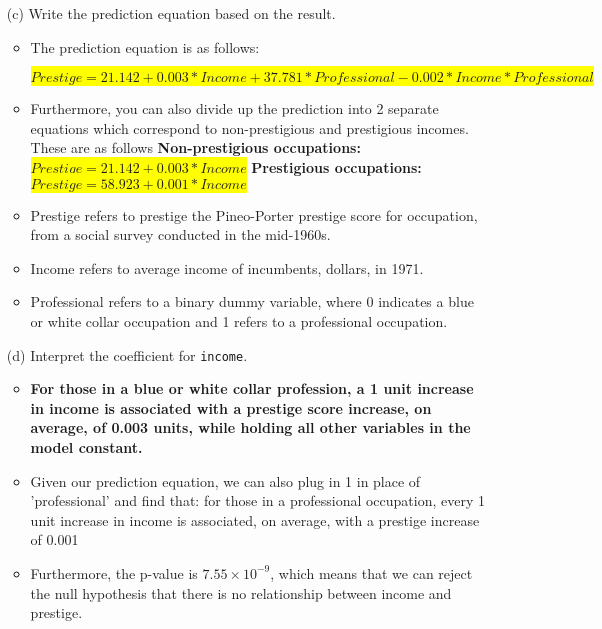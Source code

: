 \documentclass[12pt,letterpaper]{article}
\begin{document}
\begin{enumerate}
\begin{itemize}
\end{itemize}

	\item [(c)]
	Write the prediction equation based on the result.
	
	
\begin{itemize}
	\item The prediction equation is as follows:
	
	\hspace*{-1.5cm} 
	\colorbox{yellow}{$Prestige = 21.142 + 0.003*Income + 37.781*Professional - 0.002*Income*Professional$}
	\item Furthermore, you can also divide up the prediction into 2 separate equations which correspond to non-prestigious and prestigious incomes. These are as follows
	\newline \textbf{Non-prestigious occupations:} \colorbox{yellow}{$Prestige = 21.142 + 0.003*Income$}
	\newline \textbf{Prestigious occupations:}\colorbox{yellow}{$Prestige = 58.923 + 0.001*Income$}
	\item Prestige refers to prestige the Pineo-Porter prestige score for occupation, from a social survey conducted in the mid-1960s.
	\item Income refers to average income of incumbents, dollars, in 1971.
	\item Professional refers to a binary dummy variable, where 0 indicates a blue or white collar occupation and 1 refers to a professional occupation.
 
\end{itemize}
	
\newpage
	\item [(d)]
	Interpret the coefficient for \texttt{income}.
	
	
\begin{itemize}
	\item \textbf{For those in a blue or white collar profession, a 1 unit increase in income is associated with a prestige score increase, on average, of 0.003 units, while holding all other variables in the model constant.}
	
	\item Given our prediction equation, we can also plug in 1 in place of 'professional' and find that: for those in a professional occupation, every 1 unit increase in income is associated, on average, with a prestige increase of 0.001
	
	\item Furthermore, the p-value is \(7.55 \times 10^{-9}\), which means that we can reject the null hypothesis that there is no relationship between income and prestige.
\end{itemize}


\end{enumerate}
\end{document}
